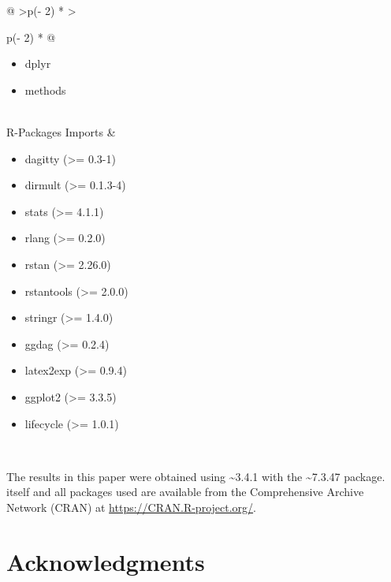 \documentclass[
  11pt,
  article]{jss}
\providecommand{\tightlist}{%
  \setlength{\itemsep}{0pt}\setlength{\parskip}{0pt}}\usepackage{longtable,booktabs,array}
\begin{document}
\begin{longtable}[]{@{}
  >{\raggedleft\arraybackslash}p{(\columnwidth - 2\tabcolsep) * }
  >{\raggedright\arraybackslash}p{(\columnwidth - 2\tabcolsep) * }@{}}
\begin{minipage}[t]{\linewidth}
\begin{itemize}
\tightlist
\item
  dplyr
\item
  methods
\end{itemize}
\end{minipage} \\
R-Packages Imports & \begin{minipage}[t]{\linewidth}\raggedright
\begin{itemize}
\tightlist
\item
  dagitty (\textgreater= 0.3-1)
\item
  dirmult (\textgreater= 0.1.3-4)
\item
  stats (\textgreater= 4.1.1)
\item
  rlang (\textgreater= 0.2.0)
\item
  rstan (\textgreater= 2.26.0)
\item
  rstantools (\textgreater= 2.0.0)
\item
  stringr (\textgreater= 1.4.0)
\item
  ggdag (\textgreater= 0.2.4)
\item
  latex2exp (\textgreater= 0.9.4)
\item
  ggplot2 (\textgreater= 3.3.5)
\item
  lifecycle (\textgreater= 1.0.1)
\end{itemize}
\end{minipage} \\
\end{longtable}

The results in this paper were obtained using
\textasciitilde3.4.1 with the
\textasciitilde7.3.47 package.  itself and all
packages used are available from the Comprehensive  Archive
Network (CRAN) at \url{https://CRAN.R-project.org/}.

\hypertarget{acknowledgments}{%
\section*{Acknowledgments}\label{acknowledgments}}
\end{document}
